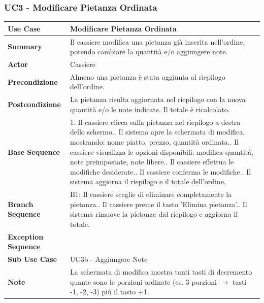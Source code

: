\newpage 
\subsubsection*{UC3 - Modificare Pietanza Ordinata}
\begin{center}
\begin{tabular}{|p{}|p{}|}
\hline
\textbf{Use Case} & Modificare Pietanza Ordinata \\ \hline
\textbf{Summary} & Il cassiere modifica una pietanza già inserita nell'ordine, potendo cambiare la quantità e/o aggiungere note. \\ \hline
\textbf{Actor} & Cassiere \\ \hline
\textbf{Precondizione} & Almeno una pietanza è stata aggiunta al riepilogo dell'ordine. \\ \hline
\textbf{Postcondizione} & La pietanza risulta aggiornata nel riepilogo con la nuova quantità e/o le note indicate. Il totale è ricalcolato. \\ \hline
\textbf{Base Sequence} & 1. Il cassiere clicca sulla pietanza nel riepilogo a destra dello schermo.\newline 2. Il sistema apre la schermata di modifica, mostrando: nome piatto, prezzo, quantità ordinata.\newline 3. Il cassiere visualizza le opzioni disponibili: modifica quantità, note preimpostate, note libere.\newline 4. Il cassiere effettua le modifiche desiderate.\newline 5. Il cassiere conferma le modifiche.\newline 6. Il sistema aggiorna il riepilogo e il totale dell'ordine. \\ \hline
\textbf{Branch Sequence} & B1: Il cassiere sceglie di eliminare completamente la pietanza.\newline 4. Il cassiere preme il tasto 'Elimina pietanza'.\newline 5. Il sistema rimuove la pietanza dal riepilogo e aggiorna il totale. \\ \hline
\textbf{Exception Sequence} & \\ \hline
\textbf{Sub Use Case} & UC3b - Aggiungere Note \\ \hline
\textbf{Note} & La schermata di modifica mostra tanti tasti di decremento quante sono le porzioni ordinate (es. 3 porzioni $\rightarrow$ tasti -1, -2, -3) più il tasto +1. \\ \hline
\end{tabular}
\end{center}
\newpage 
 

